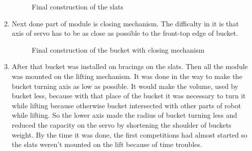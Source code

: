 \begin{enumerate}
\begin{figure}[H]
\begin{minipage}[h]{0.47\linewidth}
  		\caption{Final construction of the slats}
  	\end{minipage}
  \end{figure}
  
  \item Next done part of module is closing mechanism. The difficalty in it is that axis of servo has to be as close as possible to the front-top edge of bucket.
  
  \begin{figure}[H]
  	\begin{minipage}[h]{1\linewidth}
  		\caption{Final construction of the bucket with closing mechanism}
  	\end{minipage}
  \end{figure}
  
  \item After that bucket was installed on bracings on the slats. Then all the module was mounted on the lifting mechanism. It was done in the way to make the bucket turning axis as low as possible. It would make the volume, used by bucket less, because with that place of the bucket it was necessary to turn it while lifting because otherwise bucket intersected with other parts of robot while lifting. So the lower axis made the radius of bucket turning less and reduced the capacity on the servo by shortening the shoulder of buckets weight.
  By the time it was done, the first competitions had almost started so the slats weren't mounted on the lift because of time troubles.
  

\end{enumerate}
